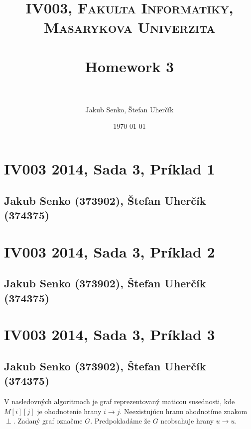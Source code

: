 \documentclass[paper=a4, fontsize=11pt]{scrartcl} %
\title{	
\normalfont \normalsize 
\textsc{IV003, Fakulta Informatiky, Masarykova Univerzita} \\ [25pt] %
\horrule{0.5pt} \\[0.4cm] %
\huge Homework 3 \\ %
\horrule{2pt} \\[0.5cm] %
}
\author{Jakub Senko, Štefan Uherčík} %
\date{\normalsize\today} %
\numberwithin{equation}{section} %
\numberwithin{figure}{section} %
\numberwithin{table}{section} %
\begin{document}


\section*{IV003 2014, Sada 3, Príklad 1}
\subsection*{Jakub Senko (373902), Štefan Uherčík (374375)}

\pagebreak


\section*{IV003 2014, Sada 3, Príklad 2}
\subsection*{Jakub Senko (373902), Štefan Uherčík (374375)}

\pagebreak


\section*{IV003 2014, Sada 3, Príklad 3}
\subsection*{Jakub Senko (373902), Štefan Uherčík (374375)}

V nasledovných algoritmoch je graf reprezentovaný maticou susednosti, kde $M[i][j]$ je ohodnotenie hrany $i \to j$. Neexistujúcu hranu ohodnotíme znakom $\perp$. Zadaný graf označme $G$. Predpokladáme že $G$ neobsahuje hrany $u \to u$.
\end{document}
